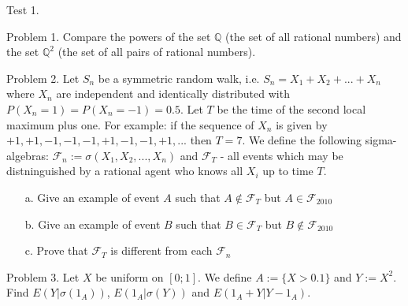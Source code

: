\documentclass[pdftex,12pt,a4paper]{article}
\begin{document}



Test 1.

Problem 1. Compare the powers of the set $ \mathbb{Q} $ (the set of all rational numbers) and the set $ \mathbb{Q}^{2} $ (the set of all pairs of rational numbers).

Problem 2. Let $ S_{n} $ be a symmetric random walk, i.e. $ S_{n}=X_{1}+X_{2}+...+X_{n} $ where $ X_{n} $ are independent and identically distributed with $ P(X_{n}=1)=P(X_{n}=-1)=0.5 $. Let $T$ be the time of the second local maximum plus one. For example: if the sequence of $ X_{n} $ is given by $ +1,+1,-1,-1,-1,+1,-1,-1,+1,... $ then $ T= 7$. We define the following sigma-algebras: $ \mathcal{F}_{n}:=\sigma(X_{1},X_{2},...,X_{n})$ and $ \mathcal{F}_{T} $ - all events which may be distninguished by a rational agent who knows all $ X_{i} $ up to time $ T $. 
\begin{itemize}
\item[a.] Give an example of event $A$ such that $ A\notin \mathcal{F}_{T} $ but $ A\in \mathcal{F}_{2010} $
\item[b.] Give an example of event $B$ such that $ B\in \mathcal{F}_{T} $ but $ B\notin \mathcal{F}_{2010} $
\item[c.] Prove that $ \mathcal{F}_{T} $ is different from each $ \mathcal{F}_{n} $
\end{itemize}

Problem 3. Let $ X $ be uniform on $[0;1]$. We define $ A:=\{X>0.1\} $ and $ Y:=X^{2} $. Find $ E(Y|\sigma(1_{A})) $, $E(1_{A}|\sigma(Y))$ and $E(1_{A}+Y|Y-1_{A})$.




\printindex %
\end{document}
